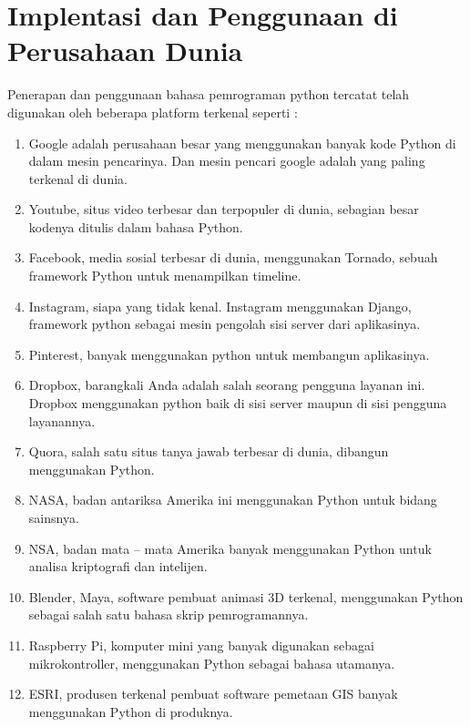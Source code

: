 \chapter*{Implentasi dan Penggunaan di Perusahaan Dunia}

\par
Penerapan dan penggunaan bahasa pemrograman python tercatat telah digunakan oleh beberapa platform terkenal seperti :

\begin{enumerate}
\item Google adalah perusahaan besar yang menggunakan banyak kode Python di dalam mesin pencarinya. Dan mesin pencari google adalah yang paling terkenal di dunia.
\item Youtube, situs video terbesar dan terpopuler di dunia, sebagian besar kodenya ditulis dalam bahasa Python.
\item Facebook, media sosial terbesar di dunia, menggunakan Tornado, sebuah framework Python untuk menampilkan timeline.
\item Instagram, siapa yang tidak kenal. Instagram menggunakan Django, framework python sebagai mesin pengolah sisi server dari aplikasinya.
\item Pinterest, banyak menggunakan python untuk membangun aplikasinya.
\item Dropbox, barangkali Anda adalah salah seorang pengguna layanan ini. Dropbox menggunakan python baik di sisi server maupun di sisi pengguna layanannya.
\item Quora, salah satu situs tanya jawab terbesar di dunia, dibangun menggunakan Python.
\item NASA, badan antariksa Amerika ini menggunakan Python untuk bidang sainsnya.
\item NSA, badan mata – mata Amerika banyak menggunakan Python untuk analisa kriptografi dan intelijen.
\item Blender, Maya, software pembuat animasi 3D terkenal, menggunakan Python sebagai salah satu bahasa skrip pemrogramannya.
\item Raspberry Pi, komputer mini yang banyak digunakan sebagai mikrokontroller, menggunakan Python sebagai bahasa utamanya.
\item ESRI, produsen terkenal pembuat software pemetaan GIS banyak menggunakan Python di produknya.

\end{enumerate}